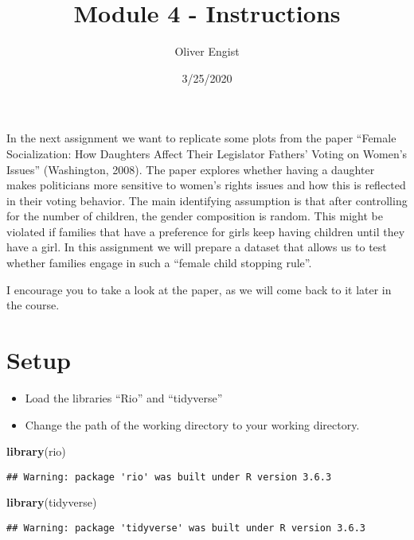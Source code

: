\documentclass[]{article}
\title{Module 4 - Instructions}
\author{Oliver Engist}
\date{3/25/2020}
\newenvironment{Shaded}{\begin{snugshade}}{\end{snugshade}}
\newcommand{\KeywordTok}[1]{\textcolor[rgb]{0.13,0.29,0.53}{\textbf{#1}}}
\newcommand{\NormalTok}[1]{#1}
\providecommand{\tightlist}{%
  \setlength{\itemsep}{0pt}\setlength{\parskip}{0pt}}
\begin{document}
\maketitle

In the next assignment we want to replicate some plots from the paper
``Female Socialization: How Daughters Affect Their Legislator Fathers'
Voting on Women's Issues'' (Washington, 2008). The paper explores
whether having a daughter makes politicians more sensitive to women's
rights issues and how this is reflected in their voting behavior. The
main identifying assumption is that after controlling for the number of
children, the gender composition is random. This might be violated if
families that have a preference for girls keep having children until
they have a girl. In this assignment we will prepare a dataset that
allows us to test whether families engage in such a ``female child
stopping rule''.

I encourage you to take a look at the paper, as we will come back to it
later in the course.

\hypertarget{setup}{%
\section{Setup}\label{setup}}

\begin{itemize}
\tightlist
\item
  Load the libraries ``Rio'' and ``tidyverse''
\item
  Change the path of the working directory to your working directory.
\end{itemize}

\begin{Shaded}
\begin{Highlighting}[]
\KeywordTok{library}\NormalTok{(rio)}
\end{Highlighting}
\end{Shaded}

\begin{verbatim}
## Warning: package 'rio' was built under R version 3.6.3
\end{verbatim}

\begin{Shaded}
\begin{Highlighting}[]
\KeywordTok{library}\NormalTok{(tidyverse)}
\end{Highlighting}
\end{Shaded}

\begin{verbatim}
## Warning: package 'tidyverse' was built under R version 3.6.3
\end{verbatim}
\end{document}

